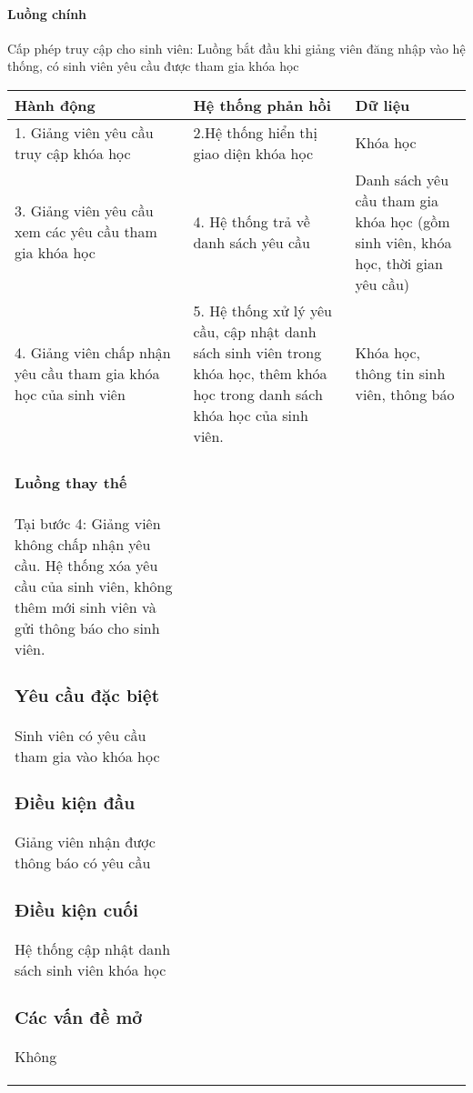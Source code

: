\documentclass[./../main_file.tex]{subfiles}
\begin{document}
\paragraph{Luồng chính}
Cấp phép truy cập cho sinh viên: Luồng bắt đầu khi giảng viên đăng nhập vào hệ thống, có sinh viên yêu cầu được tham gia khóa học
\begin{longtable}{|p{}|p{}|p{}|}
		\hline
		\textbf{Hành động}                     & \textbf{Hệ thống phản hồi}                                                                  & \textbf{Dữ liệu}                \\ \hline
		1. Giảng viên yêu cầu truy cập khóa học & 2.Hệ thống hiển thị giao diện khóa học                                       & Khóa học \\ \hline
		3. Giảng viên yêu cầu xem các yêu cầu tham gia khóa học & 4. Hệ thống trả về danh sách yêu cầu & Danh sách yêu cầu tham gia khóa học (gồm sinh viên, khóa học, thời gian yêu cầu) \\ \hline
		4. Giảng viên chấp nhận yêu cầu tham gia khóa học của sinh viên & 5. Hệ thống xử lý yêu cầu, cập nhật danh sách sinh viên trong khóa học, thêm khóa học trong danh sách khóa học của sinh viên. &
		Khóa học, thông tin sinh viên, thông báo \\ \hline
\paragraph{Luồng thay thế}
Tại bước 4: Giảng viên không chấp nhận yêu cầu. Hệ thống xóa yêu cầu của sinh viên, không thêm mới sinh viên và gửi thông báo cho sinh viên.
\subsubsection{Yêu cầu đặc biệt}
Sinh viên có yêu cầu tham gia vào khóa học

\subsubsection{Điều kiện đầu}
Giảng viên nhận được thông báo có yêu cầu 

\subsubsection{Điều kiện cuối}
Hệ thống cập nhật danh sách sinh viên khóa học

\subsubsection{Các vấn đề mở}
Không


\end{longtable}
\end{document}
